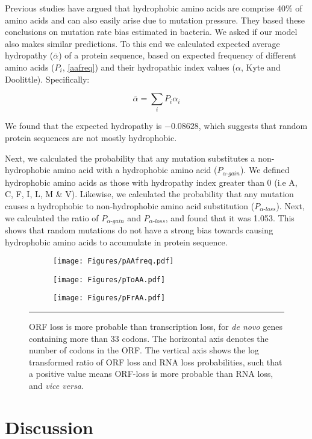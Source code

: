 \documentclass[12pt,a4paper]{article}
\begin{document}
Previous studies have argued that hydrophobic amino acids are comprise 40\% of amino acids and can also easily arise due to mutation pressure. They based these conclusions on mutation rate bias estimated in bacteria. We asked if our model also makes similar predictions. To this end we calculated expected average hydropathy ($\bar{\alpha}$) of a protein sequence, based on expected frequency of different amino acids ($P_i$, \autoref{aafreq}) and their hydropathic index values ($\alpha$, Kyte and Doolittle). Specifically: 

$$\bar{\alpha} = \sum_{i} P_i \alpha_i$$

We found that the expected hydropathy is $-0.08628$, which suggests that random protein sequences are not mostly hydrophobic. 
 
Next, we calculated the probability that any mutation substitutes a non-hydrophobic amino acid with a hydrophobic amino acid ($P_{\alpha\textit{-gain}}$). We defined hydrophobic amino acids as those with hydropathy index greater than 0 (i.e A, C, F, I, L, M \& V). Likewise, we calculated the probability that any mutation causes a hydrophobic to non-hydrophobic amino acid substitution ($P_{\alpha\textit{-loss}}$). Next, we calculated the ratio of $P_{\alpha\textit{-gain}}$ and $P_{\alpha\textit{-loss}}$, and found that it was 1.053. This shows that random mutations do not have a strong bias towards causing hydrophobic amino acids to accumulate in protein sequence. 


\begin{figure}[!t]
\centering
\begin{subfigure}{0.49\textwidth}
\caption{}
\centering
\texttt{[image: Figures/pAAfreq.pdf]}
\end{subfigure}\hfill%
\begin{subfigure}{0.49\textwidth}
\caption{}
\centering
\texttt{[image: Figures/pToAA.pdf]}
\end{subfigure}

\begin{subfigure}{0.49\textwidth}
\caption{}
\centering
\texttt{[image: Figures/pFrAA.pdf]}
\end{subfigure}


\caption{ORF loss is more probable than transcription loss, for \textit{de novo} genes containing more than 33 codons. The horizontal axis denotes the number of codons in the ORF. The vertical axis shows the log transformed ratio of ORF loss and RNA loss probabilities, such that a positive value means ORF-loss is more probable than RNA loss, and \textit{vice versa}.}
\label{aafreq}

\vspace{1ex}
\hrule
\end{figure}

\section{Discussion} 
\end{document}
